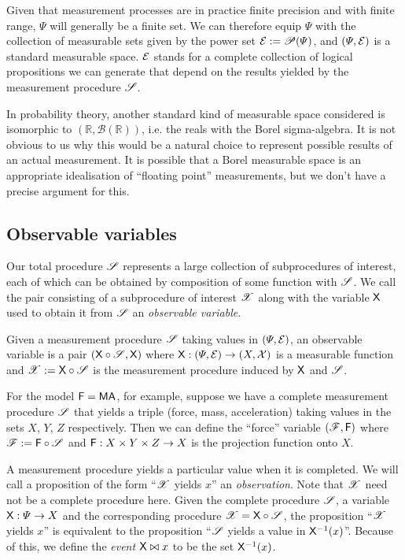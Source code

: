 Given that measurement processes are in practice finite precision and with finite range, $\Psi$ will generally be a finite set. We can therefore equip $\Psi$ with the collection of measurable sets given by the power set $\mathcal{E}:=\mathscr{P}(\Psi)$, and $(\Psi,\mathcal{E})$ is a standard measurable space. $\mathcal{E}$ stands for a complete collection of logical propositions we can generate that depend on the results yielded by the measurement procedure $\mathscr{S}$.

In probability theory, another standard kind of measurable space considered is isomorphic to $(\mathbb{R},\mathcal{B}(\mathbb{R}))$, i.e. the reals with the Borel sigma-algebra. It is not obvious to us why this would be a natural choice to represent possible results of an actual measurement. It is possible that a Borel measurable space is an appropriate idealisation of ``floating point'' measurements, but we don't have a precise argument for this.

\subsection{Observable variables}

Our total procedure $\mathscr{S}$ represents a large collection of subprocedures of interest, each of which can be obtained by composition of some function with $\mathscr{S}$. We call the pair consisting of a subprocedure of interest $\mathscr{X}$ along with the variable $\mathsf{X}$ used to obtain it from $\mathscr{S}$ an \emph{observable variable}.

\begin{definition}
Given a measurement procedure $\mathscr{S}$ taking values in $(\Psi,\mathcal{E})$, an observable variable is a pair $(\mathsf{X}\circ \mathscr{S},\mathsf{X})$ where $\mathsf{X}:(\Psi,\mathcal{E})\to (X,\mathcal{X})$ is a measurable function and $\mathscr{X}:=\mathsf{X}\circ \mathscr{S}$ is the measurement procedure induced by $\mathsf{X}$ and $\mathscr{S}$.
\end{definition}

For the model $\mathsf{F}=\mathsf{MA}$, for example, suppose we have a complete measurement procedure $\mathscr{S}$ that yields a triple (force, mass, acceleration) taking values in the sets $X$, $Y$, $Z$ respectively. Then we can define the ``force'' variable $(\mathscr{F},\mathsf{F})$ where $\mathscr{F}:=\mathsf{F}\circ \mathscr{S}$ and $\mathsf{F}:X\times Y\times Z\to X$ is the projection function onto $X$.

A measurement procedure yields a particular value when it is completed. We will call a proposition of the form ``$\mathscr{X}$ yields $x$'' an \emph{observation}. Note that $\mathscr{X}$ need not be a complete procedure here. Given the complete procedure $\mathscr{S}$, a variable $\mathsf{X}:\Psi\to X$ and the corresponding procedure $\mathscr{X}=\mathsf{X}\circ\mathscr{S}$, the proposition ``$\mathscr{X}$ yields $x$'' is equivalent to the proposition ``$\mathscr{S}$ yields a value in $\mathsf{X}^{-1}(x)$''. Because of this, we define the \emph{event} $\mathsf{X}\bowtie x$ to be the set $\mathsf{X}^{-1}(x)$.

